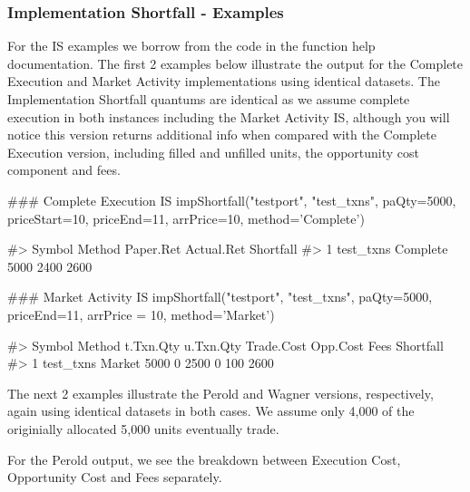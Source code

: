 \hypertarget{implementation-shortfall---examples}{%
\subsubsection{Implementation Shortfall -
Examples}\label{implementation-shortfall---examples}}

For the IS examples we borrow from the code in the function help
documentation. The first 2 examples below illustrate the output for the
Complete Execution and Market Activity implementations using identical
datasets. The Implementation Shortfall quantums are identical as we
assume complete execution in both instances including the Market
Activity IS, although you will notice this version returns additional
info when compared with the Complete Execution version, including filled
and unfilled units, the opportunity cost component and fees.

\begin{Schunk}
\begin{Sinput}
### Complete Execution IS
impShortfall("testport", "test_txns",
          paQty=5000,
          priceStart=10,
          priceEnd=11,
          arrPrice=10,
          method='Complete')
\end{Sinput}
\begin{Soutput}
#>      Symbol   Method Paper.Ret Actual.Ret Shortfall
#> 1 test_txns Complete      5000       2400      2600
\end{Soutput}
\end{Schunk}

\begin{Schunk}
\begin{Sinput}
### Market Activity IS
impShortfall("testport", "test_txns",
          paQty=5000, 
          priceEnd=11,
          arrPrice = 10,
          method='Market')
\end{Sinput}
\begin{Soutput}
#>      Symbol Method t.Txn.Qty u.Txn.Qty Trade.Cost Opp.Cost Fees Shortfall
#> 1 test_txns Market      5000         0       2500        0  100      2600
\end{Soutput}
\end{Schunk}

The next 2 examples illustrate the Perold and Wagner versions,
respectively, again using identical datasets in both cases. We assume
only 4,000 of the originially allocated 5,000 units eventually trade.

For the Perold output, we see the breakdown between Execution Cost,
Opportunity Cost and Fees separately.

